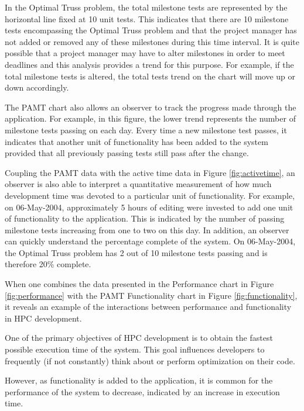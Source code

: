 \documentclass[10pt,twocolumn]{article}
\begin{document}
In the Optimal Truss problem, the total milestone tests are
represented by the horizontal line fixed at 10 unit tests.  This
indicates that there are 10 milestone tests encompassing the Optimal
Truss problem and that the project manager has not added or removed
any of these milestones during this time interval.  It is quite
possible that a project manager may have to alter milestones in order
to meet deadlines and this analysis provides a trend for this purpose.
For example, if the total milestone tests is altered, the total tests
trend on the chart will move up or down accordingly.

The PAMT chart also allows an observer to track the progress made
through the application.  For example, in this figure, the lower trend
represents the number of milestone tests passing on each day.  Every
time a new milestone test passes, it indicates that another unit of
functionality has been added to the system provided that all
previously passing tests still pass after the change.

Coupling the PAMT data with the active time data in Figure
\ref{fig:activetime}, an observer is also able to interpret a
quantitative measurement of how much development time was devoted to a
particular unit of functionality.  For example, on 06-May-2004,
approximately 5 hours of editing were invested to add one unit of
functionality to the application.  This is indicated by the number of
passing milestone tests increasing from one to two on this day.  In
addition, an observer can quickly understand the percentage complete
of the system.  On 06-May-2004, the Optimal Truss problem has 2 out of
10 milestone tests passing and is therefore 20\% complete.

\label{sec:appperfvsfunctionality}

When one combines the data presented in the Performance chart in Figure
\ref{fig:performance} with the PAMT Functionality chart in Figure
\ref{fig:functionality}, it reveals an example of the 
interactions between performance and functionality in HPC development.

One of the primary objectives of HPC development is to obtain the
fastest possible execution time of the system.  This goal influences
developers to frequently (if not constantly) think about or perform
optimization on their code.

However, as functionality is added to the application, it is common
for the performance of the system to decrease, indicated by an
increase in execution time.
\end{document}
